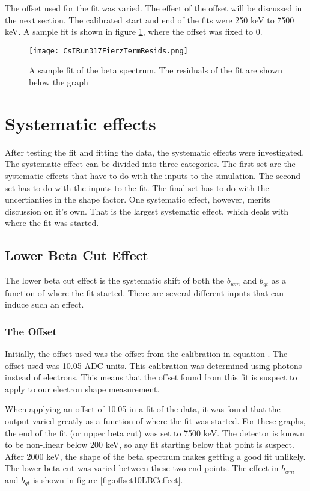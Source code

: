 \documentclass[main.tex]{subfiles}
\begin{document}
The offset used for the fit was varied.
The effect of the offset will be discussed in the next section. 
The calibrated start and end of the fits were 250 keV to 7500 keV. 
A sample fit is shown in figure \ref{fig:samplefit}, where the offset was fixed to 0.

\begin{figure}[!htb]
	\centerline{\texttt{[image: CsIRun317FierzTermResids.png]}}
	\caption{A sample fit of the beta spectrum. 
		 The residuals of the fit are shown below the graph}
	\label{fig:samplefit}
\end{figure}

\section{Systematic effects}

After testing the fit and fitting the data, the systematic effects were investigated.
The systematic effect can be divided into three categories.
The first set are the systematic effects that have to do with the inputs to the simulation.
The second set has to do with the inputs to the fit.
The final set has to do with the uncertianties in the shape factor. 
One systematic effect, however, merits discussion on it's own.
That is the largest systematic effect, which deals with where the fit was started.

\subsection{Lower Beta Cut Effect}

The lower beta cut effect is the systematic shift of both the $b_{wm}$ and $b_{gt}$ as a function of where the fit started.
There are several different inputs that can induce such an effect.

\subsubsection{The Offset}
Initially, the offset used was the offset from the calibration  in equation \label{eq:cal}.
The offset used was 10.05 ADC units.
This calibration was determined using photons instead of electrons.
This means that the offset found from this fit is suspect to apply to our electron shape measurement.

When applying an offset of 10.05 in a fit of the data, it was found that the output varied greatly as a function of where the fit was started.
For these graphs, the end of the fit (or upper beta cut) was set to 7500 keV.
The detector is known to be non-linear below 200 keV, so any fit starting below that point is suspect. 
After 2000 keV, the shape of the beta spectrum makes getting a good fit unlikely.
The lower beta cut was varied between these two end points.
The effect in $b_{wm}$ and $b_{gt}$ is shown in figure \ref{fig:offset10LBCeffect}.
\end{document}
